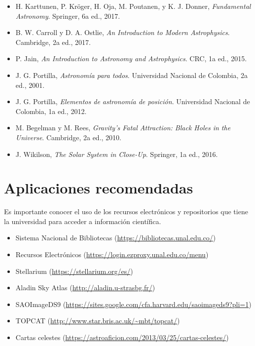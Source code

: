 \documentclass[12pt]{article}
\begin{document}
\begin{itemize}
    \item H. Karttunen, P. Kröger, H. Oja, M. Poutanen, y K. J. Donner, \textit{Fundamental Astronomy}. Springer, 6a ed., 2017.
    \item B. W. Carroll y D. A. Ostlie, \textit{An Introduction to Modern Astrophysics}. Cambridge, 2a ed., 2017.
    \item P. Jain, \textit{An Introduction to Astronomy and Astrophysics}. CRC, 1a ed., 2015.
    \item J. G. Portilla, \textit{Astronomía para todos}. Universidad Nacional de Colombia, 2a ed., 2001.
    \item J. G. Portilla, \textit{Elementos de astronomía de posición}. Universidad Nacional de Colombia, 1a ed., 2012.
    \item M. Begelman y M. Rees, \textit{Gravity’s Fatal Attraction: Black Holes in the Universe}. Cambridge, 2a ed., 2010.
    \item J. Wikilson, \textit{The Solar System in Close-Up}. Springer, 1a ed., 2016.
\end{itemize}

\section*{Aplicaciones recomendadas}

Es importante conocer el uso de los recursos electrónicos y repositorios que tiene la universidad para acceder a información científica.
\begin{itemize}
    \item Sistema Nacional de Bibliotecas (\url{https://bibliotecas.unal.edu.co/})
    \item Recursos Electrónicos (\url{https://login.ezproxy.unal.edu.co/menu})
\end{itemize}
\begin{itemize}
    \item Stellarium (\url{https://stellarium.org/es/})
    \item Aladin Sky Atlas (\url{http://aladin.u-strasbg.fr/})
    \item SAOImageDS9 (\url{https://sites.google.com/cfa.harvard.edu/saoimageds9?pli=1})
    \item TOPCAT (\url{http://www.star.bris.ac.uk/~mbt/topcat/})
    \item Cartas celestes (\url{https://astroaficion.com/2013/03/25/cartas-celestes/})
\end{itemize}
\end{document}
